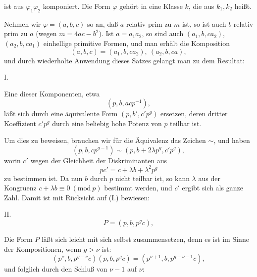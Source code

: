 ist aus $\varphi_1\varphi_2$ komponiert. Die Form $\varphi$ gehört in eine Klasse $k$, die aus $k_1,k_2$  heißt.

Nehmen wir $\varphi=(a,b,c)$ so an, daß $a$ relativ prim zu $m$ ist, so ist auch $b$ relativ prim zu $a$ (wegen $m=4ac-b^2$). Ist $a=a_1a_2$, so sind auch $(a_1,b,ca_2)$, $(a_2,b,ca_1)$ einhellige primitive Formen, und man erhält die Komposition
\[
(a,b,c) = (a_1,b,ca_2),\ (a_2,b,ca), %
\]
und durch wiederholte Anwendung dieses Satzes gelangt man zu dem Resultat:

I. 

Eine dieser Komponenten, etwa
\[
(p,b,acp^{-1}),
\]
läßt sich durch eine äquivalente Form $(p,b',c'p^g)$ ersetzen, deren dritter Koeffizient $c'p^g$ durch eine beliebig hohe Potenz von $p$ teilbar ist.

Um dies zu beweisen, brauchen wir für die Äquivalenz das Zeichen $\sim$, und haben
\[
(p,b,cp^{g-1}) \sim (p,b+2\lambda p^g,c'p^g),
\]
worin $c'$ wegen der Gleichheit der Diskriminanten aus
\[
pc' = c+\lambda b+\lambda^2 p^g
\]
zu bestimmen ist. Da nun $b$ durch $p$ nicht teilbar ist, so kann $\lambda$ aus der Kongruenz $c+\lambda b \equiv 0\ (\mathrm{mod}\ p)$ bestimmt werden, und $c'$ ergibt sich als ganze Zahl. Damit ist mit Rücksicht auf (I.) bewiesen:

II. 
\[
P=(p,b,p^gc),
\]

Die Form $P$ läßt sich leicht mit sich selbst zusammensetzen, denn es ist im Sinne der Kompositionen, wenn $g>\nu$ ist:
\[
(p^\nu,b,p^{g-\nu}c)(p,b,p^gc) = (p^{\nu+1},b,p^{g-\nu-1}c),
\]
und folglich durch den Schluß von $\nu-1$ auf $\nu$:
